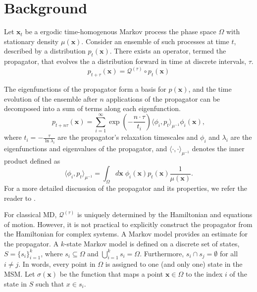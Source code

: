 \documentclass[journal=jpcbfk, layout=traditional, manuscript=article]{achemso}
\begin{document}
\section{Background}
Let $\mathbf{x}_t$ be a ergodic time-homogenous Markov process the phase space $\Omega$ with stationary density $\mu(\mathbf{x})$. Consider an ensemble of such processes at time $t$, described by a distribution $p_t(\mathbf{x})$. There exists an operator, termed the propagator, that evolves the a distribution forward in time at discrete intervals, $\tau$.
$$
p_{t+\tau}(\mathbf{x}) = \mathcal{Q}^{(\tau)} \circ p_{t}(\mathbf{x})
$$

The eigenfunctions of the propagator form a basis for $p(\mathbf{x})$, and the time evolution of the ensemble after $n$ applications of the propagator can be decomposed into a sum of terms along each eigenfunction.
$$
p_{t+n\tau}(\mathbf{x}) = \sum_{i=1}^\infty \exp\left(-\frac{n \cdot \tau}{t_i}\right) \langle \phi_i, p_t \rangle_{\mu^{-1}} \phi_i(\mathbf{x}),
$$
where $t_i = -\displaystyle\frac{\tau}{\ln \lambda_i}$ are the propagator's relaxation timescales and $\phi_i$ and $\lambda_i$ are the eigenfunctions and eigenvalues of the propagator, and $\langle \cdot, \cdot \rangle_{\mu^{-1}}$ denotes the inner product defined as
$$
\langle \phi_i, p_t \rangle_{\mu^{-1}} = \int_\Omega d\mathbf{x}\; \phi_i(\mathbf{x}) p_t(\mathbf{x}) \frac{1}{\mu(\mathbf{x})}.
$$
For a more detailed discussion of the propagator and its properties, we refer the reader to \citet{Prinz2011Generation}.

For classical MD, $\mathcal{Q}^{(\tau)}$ is uniquely determined by the Hamiltonian and equations of motion\cite{}. However, it is not practical to explicitly construct the propagator from the Hamiltonian for complex systems. A Markov model provides an estimate for the propagator. A $k$-state Markov model is defined on a discrete set of states, $S = \{s_i\}_{i=1}^k$, where $s_i \subseteq \Omega$ and $\bigcup_{i=1}^k s_i = \Omega$. Furthermore, $s_i \cap s_j = \emptyset$ for all $i \neq j$. In words, every point in $\Omega$ is assigned to one (and only one) state in the MSM. Let $\sigma(\mathbf{x})$ be the function that maps a point $\mathbf{x} \in \Omega$ to the index $i$ of the state in $S$ such that $x \in s_i$.
\end{document}
